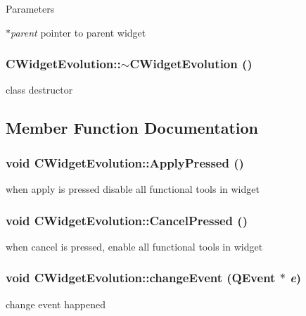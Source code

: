 \begin{DoxyParams}{Parameters}
\item[{\em $\ast$parent}]pointer to parent widget \end{DoxyParams}
\hypertarget{classCWidgetEvolution_a367c1cdbb1c2ca9a07bc849aefb72dde}{
\subsubsection[{$\sim$CWidgetEvolution}]{\setlength{\rightskip}{0pt plus 5cm}CWidgetEvolution::$\sim$CWidgetEvolution ()}}
\label{classCWidgetEvolution_a367c1cdbb1c2ca9a07bc849aefb72dde}
class destructor 

\subsection{Member Function Documentation}
\hypertarget{classCWidgetEvolution_a12c4341a31c05a4311af2de591575845}{
\subsubsection[{ApplyPressed}]{\setlength{\rightskip}{0pt plus 5cm}void CWidgetEvolution::ApplyPressed ()}}
\label{classCWidgetEvolution_a12c4341a31c05a4311af2de591575845}
when apply is pressed disable all functional tools in widget \hypertarget{classCWidgetEvolution_ae8cd94dd178c48cd41e51fd37df02606}{
\subsubsection[{CancelPressed}]{\setlength{\rightskip}{0pt plus 5cm}void CWidgetEvolution::CancelPressed ()}}
\label{classCWidgetEvolution_ae8cd94dd178c48cd41e51fd37df02606}
when cancel is pressed, enable all functional tools in widget \hypertarget{classCWidgetEvolution_ac15f1ad2dbe291bfbc5ac6a815d03820}{
\subsubsection[{changeEvent}]{\setlength{\rightskip}{0pt plus 5cm}void CWidgetEvolution::changeEvent (QEvent $\ast$ {\em e})}}
\label{classCWidgetEvolution_ac15f1ad2dbe291bfbc5ac6a815d03820}
change event happened


